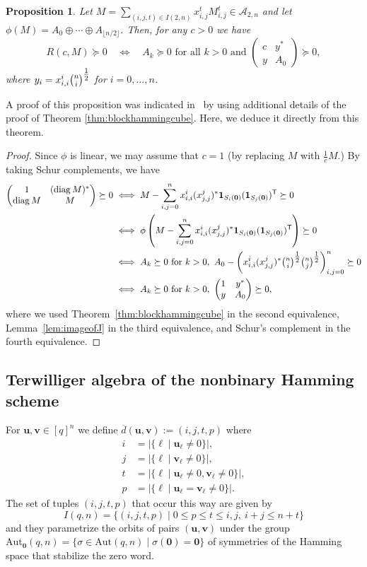 \documentclass[10pt,a4paper]{article}
\newcommand{\one}{\mathbf{1}}
\newtheorem{proposition}[theorem]{Proposition}
\theoremstyle{definition}
\newcommand{\uu}{\mathbf{u}}
\newcommand{\vv}{\mathbf{v}}
\newcommand{\zero}{\mathbf{0}}
\newcommand{\Aut}{\mathrm{Aut}}
\newcommand{\AutZ}{\mathrm{Aut}_{\zero}}
\newcommand{\T}{^{\mathsf{T}}}
\DeclareMathOperator*{\diag}{diag}
\begin{document}
\begin{proposition}\label{prop:RMpsdbinary}
Let $M=\sum_{(i,j,t)\in I(2,n)}x_{i,j}^{t}M_{i,j}^{t}\in \mathcal{A}_{2,n}$ and let 
$\phi(M)=A_0\oplus\cdots\oplus A_{\lfloor n/2\rfloor}$.
Then, for any $c>0$ we have 
\[
R(c,M)\succeq 0\quad\iff\quad A_{k}\succeq 0 \text{ for all $k>0$ and } \begin{pmatrix}c&y^*\\y&A_{0}\end{pmatrix}\succeq 0,
\]
where $y_i=x_{i,i}^{i} \tbinom{n}{i}^{\tfrac{1}{2}}$ for $i=0,\ldots, n$.
\end{proposition}
A proof of this proposition was indicated in~\cite[Lemma 1]{Laurent} by using additional details of the proof of Theorem \ref{thm:blockhammingcube}. Here, we deduce it directly from this theorem.
\begin{proof}
Since $\phi$ is linear, we may assume that $c=1$ (by replacing $M$ with $\tfrac{1}{c}M$.) 
By taking Schur complements, we have 
\begin{align*}
\begin{pmatrix}1&(\diag M)^*\\\diag M&M\end{pmatrix}\succeq 0 &\iff M-\sum_{i,j=0}^n x_{i,i}^{i}(x_{j,j}^{j})^*\one_{S_i(\zero)}(\one_{S_j(\zero)})\T\succeq 0\\
&\iff \phi\left(M-\sum_{i,j=0}^n x_{i,i}^{i}(x_{j,j}^{j})^*\one_{S_i(\zero)}(\one_{S_j(\zero)})\T\right)\succeq 0\\
&\iff A_{k}\succeq 0 \text{ for $k>0$},\ A_{0}-\left( x_{i,i}^{i}(x_{j,j}^{j})^*\tbinom{n}{i}^{\tfrac{1}{2}}\tbinom{n}{j}^{\tfrac{1}{2}}\right)_{i,j=0}^n\succeq 0\\
&\iff A_k\succeq 0 \text{ for $k>0$},\ \begin{pmatrix}1&y^*\\y&A_{0}\end{pmatrix}\succeq 0,
\end{align*}
where we used Theorem~\ref{thm:blockhammingcube} in the second equivalence, Lemma~\ref{lem:imageofJ} in the third equivalence, and Schur's complement in the fourth equivalence.
\end{proof}


\subsection{Terwilliger algebra of the nonbinary Hamming scheme \label{sec:terwilligerqary}}
For $\uu,\vv\in [q]^n$ we define $\overline{d}(\uu,\vv):=(i,j,t,p)$ where 
\begin{align*}
i&=|\{\ell\mid \uu_\ell\neq 0\}|,\\
j&=|\{\ell\mid \vv_\ell\neq 0\}|,\\
t&=|\{\ell\mid \uu_\ell\neq 0, \vv_\ell\neq 0\}|,\\
p&=|\{\ell\mid \uu_\ell=\vv_\ell\neq 0\}|.
\end{align*}
The set of tuples $(i,j,t,p)$ that occur this way are given by \[
I(q,n)=\{(i,j,t,p)\mid 0\leq p\leq t\leq i,j,\ i+j\leq n+t\}
\]
and they parametrize the orbits of pairs $(\uu,\vv)$ under the group $\AutZ(q,n)=\{\sigma\in \Aut(q,n)\mid \sigma(\zero)=\zero\}$ of symmetries of the Hamming space that stabilize the zero word.
\end{document}
